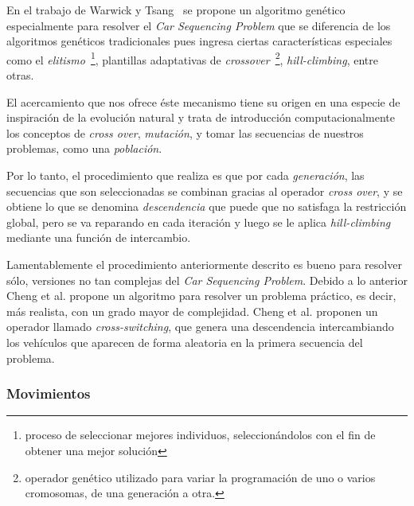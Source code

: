 En el trabajo de Warwick y Tsang~\cite{WT95} se propone un algoritmo genético especialmente
para resolver el \emph{Car Sequencing Problem} que se diferencia de los algoritmos genéticos
tradicionales pues ingresa ciertas características especiales como el \emph{elitismo}~\footnote{
proceso de seleccionar mejores individuos, seleccionándolos con el fin de obtener una mejor solución
}, plantillas adaptativas de \emph{crossover}~\footnote{
operador genético utilizado para variar la programación de uno o varios cromosomas, de una generación  a otra.
}, \emph{hill-climbing}, entre otras.

El acercamiento que nos ofrece éste mecanismo tiene su origen en una especie de inspiración
de la evolución natural y trata de introducción computacionalmente los conceptos de \emph{cross over},
\emph{mutación}, y tomar las secuencias de nuestros problemas, como una \emph{población}.

Por lo tanto, el procedimiento que realiza es que por cada \emph{generación}, las secuencias
que son seleccionadas se combinan gracias al operador \emph{cross over}, y se obtiene lo
que se denomina \emph{descendencia} que puede que no satisfaga la restricción global,
pero se va reparando en cada iteración y luego se le aplica \emph{hill-climbing} mediante
una función de intercambio.

Lamentablemente el procedimiento anteriormente descrito es bueno para resolver sólo,
versiones no tan complejas del \emph{Car Sequencing Problem}.
Debido a lo anterior Cheng et al. \cite{CLP+99} propone un algoritmo para resolver un
problema práctico, es decir, más realista, con un grado mayor de complejidad.
Cheng et al. \cite{CLP+99} proponen un operador llamado \emph{cross-switching},
que genera una descendencia intercambiando los vehículos que aparecen de forma aleatoria
en la primera secuencia del problema.

\subsubsection{Movimientos}

